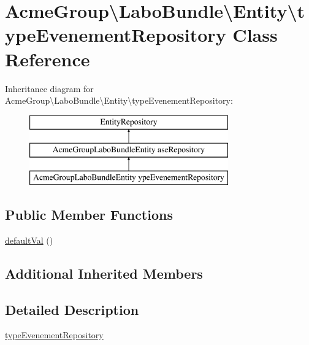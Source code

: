 \hypertarget{class_acme_group_1_1_labo_bundle_1_1_entity_1_1type_evenement_repository}{\section{Acme\+Group\textbackslash{}Labo\+Bundle\textbackslash{}Entity\textbackslash{}type\+Evenement\+Repository Class Reference}
\label{class_acme_group_1_1_labo_bundle_1_1_entity_1_1type_evenement_repository}
}
Inheritance diagram for Acme\+Group\textbackslash{}Labo\+Bundle\textbackslash{}Entity\textbackslash{}type\+Evenement\+Repository\+:\begin{figure}[H]
\begin{center}
\leavevmode
\includegraphics[height=3.000000cm]{class_acme_group_1_1_labo_bundle_1_1_entity_1_1type_evenement_repository}
\end{center}
\end{figure}
\subsection*{Public Member Functions}
\begin{DoxyCompactItemize}
\item 
\hyperlink{class_acme_group_1_1_labo_bundle_1_1_entity_1_1type_evenement_repository_a5fa05ee45b331d7cb52c2fc201dba1fa}{default\+Val} ()
\end{DoxyCompactItemize}
\subsection*{Additional Inherited Members}


\subsection{Detailed Description}
\hyperlink{class_acme_group_1_1_labo_bundle_1_1_entity_1_1type_evenement_repository}{type\+Evenement\+Repository}

